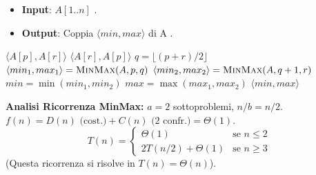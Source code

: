 \begin{example}
\begin{itemize}
    \item \textbf{Input}: $A[1..n]$ .
    \item \textbf{Output}: Coppia $\langle min, max \rangle$ di A .
\end{itemize}
\end{example}

\begin{algorithmic}[1]
     
            \State \Return $\langle A[p], A[r] \rangle$ 
        \Else
            \State \Return $\langle A[r], A[p] \rangle$
        \EndIf
    \Else
        \State $q = \lfloor (p+r)/2 \rfloor$ 
        \State $\langle min_1, max_1 \rangle = \Call{MinMax}{A, p, q}$ 
        \State $\langle min_2, max_2 \rangle = \Call{MinMax}{A, q+1, r}$ 
        \State $min = \min(min_1, min_2)$ 
        \State $max = \max(max_1, max_2)$
        \State \Return $\langle min, max \rangle$
    \EndIf
\EndProcedure
\end{algorithmic}


\begin{observation}
\textbf{Analisi Ricorrenza MinMax:}
$a=2$ sottoproblemi, $n/b = n/2$.
$f(n) = D(n) \text{ (cost.)} + C(n) \text{ (2 confr.)} = \Theta(1)$.
$$ T(n) = \begin{cases} \Theta(1) & \text{se } n \le 2 \\ 2T(n/2) + \Theta(1) & \text{se } n \ge 3 \end{cases} $$
(Questa ricorrenza si risolve in $T(n) = \Theta(n)$).
\end{observation}

\newpage